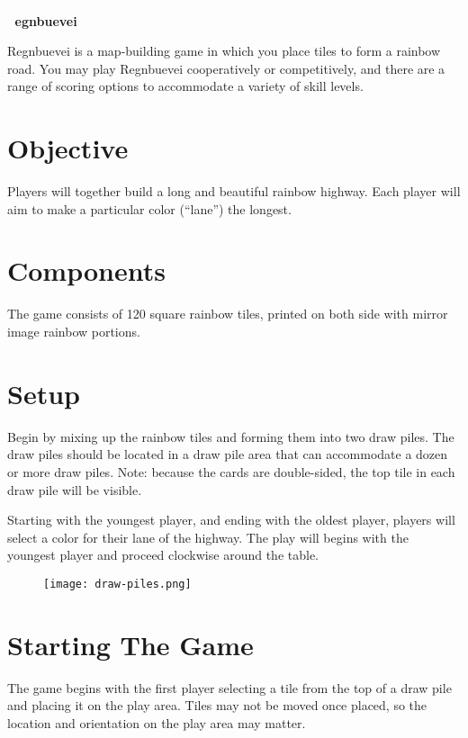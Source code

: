 \documentclass[twocolumn, 11pt]{article}
\begin{document}
{
  \textcolor{white}{.}\\
  \textcolor{white}{.}\Huge \bf\hspace{0.3em} egnbuevei
}

\vspace{1.7em}\noindent
Regnbuevei is a map-building game in which you place tiles to form a rainbow road.  You may play Regnbuevei cooperatively or competitively, and there are a range of scoring options to accommodate a variety of skill levels.

\section*{Objective}

Players will together build a long and beautiful rainbow highway.
Each player will aim to make a particular color (``lane'') the
longest.
\section*{Components}
The game consists of 120 square rainbow tiles, printed on both side with mirror image rainbow portions.

\section*{Setup}

Begin by mixing up the rainbow tiles and forming them into two draw
piles. The draw piles should be located in a draw pile area that can
accommodate a dozen or more draw piles.  Note: because the cards are
double-sided, the top tile in each draw pile will be visible.

Starting with the youngest player, and ending with the oldest player,
players will select a color for their lane of the highway.  The play
will begins with the youngest player and proceed clockwise around the
table.
\begin{figure}[h]
  \texttt{[image: draw-piles.png]}
\end{figure}
\section*{Starting The Game}
The game begins with the first player selecting a tile from the top of
a draw pile and placing it on the play area.  Tiles may not be moved
once placed, so the location and orientation on the play area may
matter.
\end{document}
